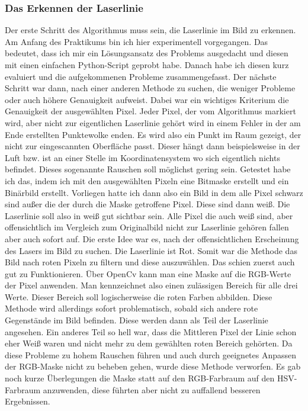 		\subsubsection{Das Erkennen der Laserlinie}
		Der erste Schritt des Algorithmus muss sein, die Laserlinie im Bild zu erkennen. Am Anfang des Praktikums bin ich hier experimentell vorgegangen. Das bedeutet, dass ich mir ein Lösungsansatz des Problems ausgedacht und diesen mit einen einfachen Python-Script geprobt habe. Danach habe ich diesen kurz evaluiert und die aufgekommenen Probleme zusammengefasst. Der nächste Schritt war dann, nach einer anderen Methode zu suchen, die weniger Probleme oder auch höhere Genauigkeit aufweist. Dabei war ein wichtiges Kriterium die Genauigkeit der ausgewählten Pixel. Jeder Pixel, der vom Algorithmus markiert wird, aber nicht zur eigentlichen Laserlinie gehört wird in einem Fehler in der am Ende erstellten Punktewolke enden. Es wird also ein Punkt im Raum gezeigt, der nicht zur eingescannten Oberfläche passt. Dieser hängt dann beispielsweise in der Luft bzw. ist an einer Stelle im Koordinatensystem wo sich eigentlich nichts befindet. Dieses sogenannte Rauschen soll möglichst gering sein. Getestet habe ich das, indem ich mit den ausgewählten Pixeln eine Bitmaske erstellt und ein Binärbild erstellt. Vorliegen hatte ich dann also ein Bild in dem alle Pixel schwarz sind außer die der durch die Maske getroffene Pixel. Diese sind dann weiß. Die Laserlinie soll also in weiß gut sichtbar sein. Alle Pixel die auch weiß sind, aber offensichtlich im Vergleich zum Originalbild nicht zur Laserlinie gehören fallen aber auch sofort auf.\newline
		Die erste Idee war es, nach der offensichtlichen Erscheinung des Lasers im Bild zu suchen. Die Laserlinie ist Rot. Somit war die Methode das Bild nach roten Pixeln zu filtern und diese auszuwählen. Das schien zuerst auch gut zu Funktionieren. Über OpenCv kann man eine Maske auf die RGB-Werte der Pixel anwenden. Man kennzeichnet also einen zulässigen Bereich für alle drei Werte. Dieser Bereich soll logischerweise die roten Farben abbilden. Diese Methode wird allerdings sofort problematisch, sobald sich andere rote Gegenstände im Bild befinden. Diese werden dann als Teil der Laserlinie angesehen. Ein anderes Teil so hell war, dass die Mittleren Pixel der Linie schon eher Weiß waren und nicht mehr zu dem gewählten roten Bereich gehörten. Da diese Probleme zu hohem Rauschen führen und auch durch geeignetes Anpassen der RGB-Maske nicht zu beheben gehen, wurde diese Methode verworfen. Es gab noch kurze Überlegungen die Maske statt auf den RGB-Farbraum auf den HSV-Farbraum anzuwenden, diese führten aber nicht zu auffallend besseren Ergebnissen. \newline
